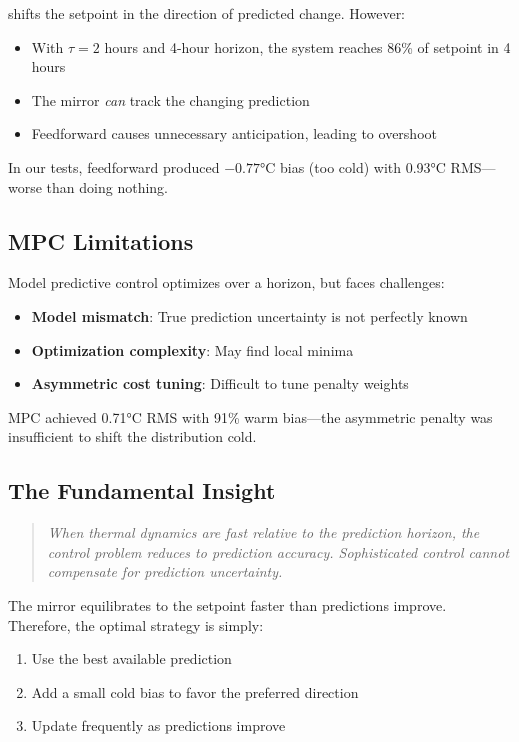 \documentclass[11pt,letterpaper]{article}
\begin{document}
shifts the setpoint in the direction of predicted change. However:

\begin{itemize}
    \item With $\tau = 2$ hours and 4-hour horizon, the system reaches 86\% of setpoint in 4 hours
    \item The mirror \textit{can} track the changing prediction
    \item Feedforward causes unnecessary anticipation, leading to overshoot
\end{itemize}

In our tests, feedforward produced $-0.77$°C bias (too cold) with 0.93°C RMS---worse than doing nothing.

\subsection{MPC Limitations}

Model predictive control optimizes over a horizon, but faces challenges:

\begin{itemize}
    \item \textbf{Model mismatch}: True prediction uncertainty is not perfectly known
    \item \textbf{Optimization complexity}: May find local minima
    \item \textbf{Asymmetric cost tuning}: Difficult to tune penalty weights
\end{itemize}

MPC achieved 0.71°C RMS with 91\% warm bias---the asymmetric penalty was insufficient to shift the distribution cold.

\subsection{The Fundamental Insight}

\begin{quote}
\textit{When thermal dynamics are fast relative to the prediction horizon, the control problem reduces to prediction accuracy. Sophisticated control cannot compensate for prediction uncertainty.}
\end{quote}

The mirror equilibrates to the setpoint faster than predictions improve. Therefore, the optimal strategy is simply:

\begin{enumerate}
    \item Use the best available prediction
    \item Add a small cold bias to favor the preferred direction
    \item Update frequently as predictions improve
\end{enumerate}
\end{document}
